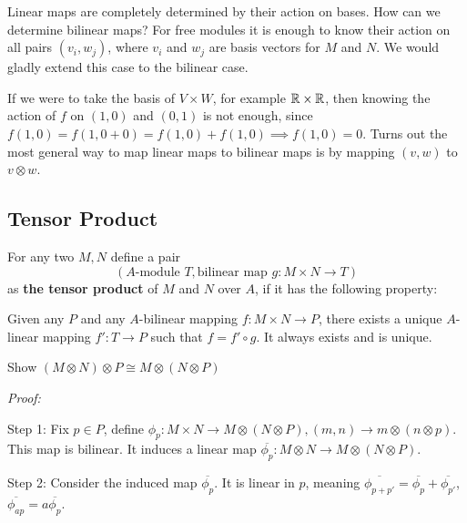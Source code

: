 Linear maps are completely determined by their action on bases. How can we determine bilinear maps? For free modules it is enough to know their action on all pairs $(v_i,w_j)$, where $v_i$ and $w_j$ are basis vectors for $M$ and $N$. We would gladly extend this case to the bilinear case.

If we were to take the basis of $V\times W$, for example $\mathbb{R} \times \mathbb{R}$, then knowing the action of $f$ on $(1,0)$ and $(0,1)$ is not enough, since $f(1,0)=f(1,0+0) = f(1,0)+f(1,0) \implies f(1,0) = 0$. Turns out the most general way to map linear maps to bilinear maps is by mapping $(v,w)$ to $v\otimes w$.

\subsection{Tensor Product}

\begin{definition} 
    For any two $M,N$ define a pair 
    $$(A\text{-module } T,  \text{bilinear map }g:M\times N \rightarrow T)$$
    as \textbf{the tensor product} of $M$ and $N$ over $A$, if it has the following property:

    Given any $P$ and any $A$-bilinear mapping $f:M\times N \rightarrow P$, there exists a unique $A$-linear mapping $f':T\rightarrow P$ such that $f= f' \circ g$. It always exists and is unique.
\end{definition}


\begin{exercise}
    Show $(M\otimes N) \otimes P \cong M \otimes (N\otimes P)$
\end{exercise}

\textit{Proof:} 

Step 1: Fix $p\in P$, define $\phi_p: M\times N \longrightarrow M \otimes (N\otimes P), (m,n) \longrightarrow m \otimes (n \otimes p)$. This map is bilinear. It induces a linear map $\overline{\phi_p}: M \otimes N \rightarrow  M \otimes (N\otimes P)$.

Step 2: Consider the induced map $\overline{\phi_p}$. It is linear in $p$, meaning $\overline{\phi_{p+p'}}=\overline{\phi_p} + \overline{\phi_{p'}}$, $\overline{\phi_{ap}} = a \overline{\phi_p}$.


